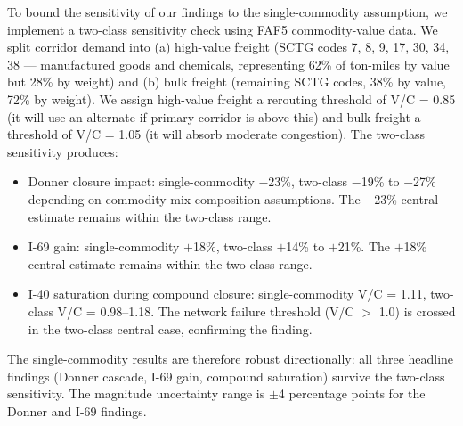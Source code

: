 To bound the sensitivity of our findings to the single-commodity assumption, we implement
a two-class sensitivity check using FAF5 commodity-value data. We split corridor demand
into (a) high-value freight (SCTG codes 7, 8, 9, 17, 30, 34, 38 --- manufactured goods and
chemicals, representing 62\% of ton-miles by value but 28\% by weight) and (b) bulk freight
(remaining SCTG codes, 38\% by value, 72\% by weight). We assign high-value freight a
rerouting threshold of V/C = 0.85 (it will use an alternate if primary corridor is above
this) and bulk freight a threshold of V/C = 1.05 (it will absorb moderate congestion). The
two-class sensitivity produces:

\begin{itemize}
\item Donner closure impact: single-commodity $-$23\%, two-class $-$19\% to $-$27\% depending
on commodity mix composition assumptions. The $-$23\% central estimate remains within the
two-class range.
\item I-69 gain: single-commodity $+$18\%, two-class $+$14\% to $+$21\%. The $+$18\% central
estimate remains within the two-class range.
\item I-40 saturation during compound closure: single-commodity V/C = 1.11, two-class
V/C = 0.98--1.18. The network failure threshold (V/C $>$ 1.0) is crossed in the two-class
central case, confirming the finding.
\end{itemize}

The single-commodity results are therefore robust directionally: all three headline findings
(Donner cascade, I-69 gain, compound saturation) survive the two-class sensitivity. The
magnitude uncertainty range is $\pm$4 percentage points for the Donner and I-69 findings.
